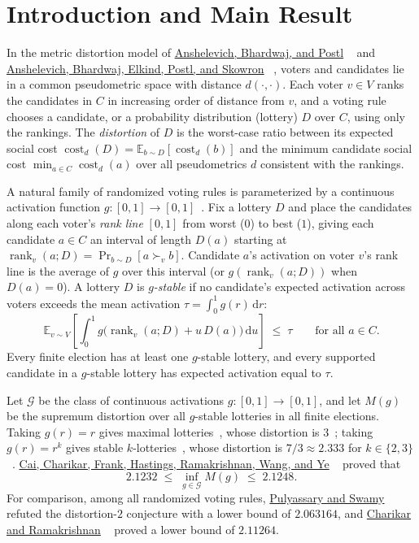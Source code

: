 \documentclass[11pt]{article}
\newcommand{\citelink}[2]{%
  \hyperlink{cite.#2}{\textcolor{CitationBlue}{#1}}%
}
\numberwithin{equation}{section}
\theoremstyle{plain}
\theoremstyle{definition}
\newcommand{\E}{\mathbb{E}}
\newcommand{\1}{\mathbf{1}}
\newcommand{\cost}{\operatorname{cost}}
\newcommand{\rank}{\operatorname{rank}}
\newcommand{\calG}{\mathcal{G}}
\begin{document}
\hypersetup{pageanchor=true}

\section{Introduction and Main Result}
\label{sec:intro}

In the metric distortion model of \citelink{Anshelevich, Bhardwaj, and Postl}{AnshelevichBhardwajPostl15}~\cite{AnshelevichBhardwajPostl15} and \citelink{Anshelevich, Bhardwaj, Elkind, Postl, and Skowron}{AnshelevichEtAl18}~\cite{AnshelevichEtAl18}, voters and candidates lie in a common pseudometric space with distance $d(\cdot, \cdot)$. Each voter $v \in V$ ranks the candidates in $C$ in increasing order of distance from $v$, and a voting rule chooses a candidate, or a probability distribution (lottery) $D$ over $C$, using only the rankings. The \emph{distortion} of $D$ is the worst-case ratio between its expected social cost $\cost_d(D) = \E_{b \sim D}[\cost_d(b)]$ and the minimum candidate social cost $\min_{a \in C} \cost_d(a)$ over all pseudometrics $d$ consistent with the rankings.

A natural family of randomized voting rules is parameterized by a continuous activation function $g \colon [0, 1] \to [0, 1]$~\cite{Kreweras65,Fishburn84,ChengEtAl20,CharikarEtAl25}. Fix a lottery $D$ and place the candidates along each voter's \emph{rank line} $[0, 1]$ from worst ($0$) to best ($1$), giving each candidate $a \in C$ an interval of length $D(a)$ starting at $\rank_v(a; D) = \Pr_{b \sim D}[a \succ_v b]$. Candidate $a$'s activation on voter $v$'s rank line is the average of $g$ over this interval (or $g(\rank_v(a; D))$ when $D(a) = 0$). A lottery $D$ is \emph{$g$-stable} if no candidate's expected activation across voters exceeds the mean activation $\tau = \int_0^1 g(r)\,\mathrm{d}r$:
\[
  \E_{v \sim V}\!\left[\int_0^1 g\bigl(\rank_v(a; D) + u\,D(a)\bigr)\,\mathrm{d}u\right] \;\le\; \tau
  \qquad \text{for all } a \in C.
\]
Every finite election has at least one $g$-stable lottery, and every supported candidate in a $g$-stable lottery has expected activation equal to $\tau$.

Let $\calG$ be the class of continuous activations $g \colon [0, 1] \to [0, 1]$, and let $M(g)$ be the supremum distortion over all $g$-stable lotteries in all finite elections. Taking $g(r) = r$ gives maximal lotteries~\cite{Kreweras65,Fishburn84}, whose distortion is $3$~\cite{CharikarEtAl24}; taking $g(r) = r^k$ gives stable $k$-lotteries~\cite{ChengEtAl20,CharikarEtAl25b}, whose distortion is $7/3 \approx 2.333$ for $k \in \{2, 3\}$~\cite{CaiEtAl26b}. \citelink{Cai, Charikar, Frank, Hastings, Ramakrishnan, Wang, and Ye}{CaiEtAl26b}~\cite{CaiEtAl26b} proved that
\[
  2.1232 \;\le\; \inf_{g \in \calG} M(g) \;\le\; 2.1248.
\]
For comparison, among all randomized voting rules, \citelink{Pulyassary and Swamy}{PulyassarySwamy21}~\cite{PulyassarySwamy21} refuted the distortion-$2$ conjecture with a lower bound of $2.063164$, and \citelink{Charikar and Ramakrishnan}{CharikarRamakrishnan22}~\cite{CharikarRamakrishnan22} proved a lower bound of $2.11264$.
\end{document}
